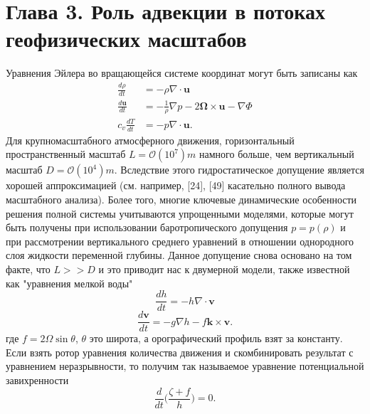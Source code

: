 \chapter*{Глава 3. Роль адвекции в потоках геофизических масштабов} \label{chapt_3}
Уравнения Эйлера во вращающейся системе координат могут быть записаны как
%
\begin{align}
\label{eq:equation3_1}
\frac{d\rho}{dt}&=-\rho\nabla\cdot\mathbf{u}\\
\label{eq:equation3_2}
\frac{d\mathbf{u}}{dt}&=-\frac{1}{\rho}\nabla p - 2 \mathbf{\Omega} \times \mathbf{u} - \nabla \Phi\\
\label{eq:equation3_3}
c_v\frac{dT}{dt}&=-p\nabla\cdot\mathbf{u}.
\end{align}
%
Для крупномасштабного атмосферного движения, горизонтальный пространственный масштаб $L=\mathcal{O}(10^7)m$ намного больше, чем вертикальный масштаб $D=\mathcal{O}(10^4)m$. Вследствие этого гидростатическое допущение является хорошей аппроксимацией (см. например, [24], [49] касательно полного вывода масштабного анализа). Более того, многие ключевые динамические особенности решения полной системы учитываются упрощенными моделями, которые могут быть получены при использовании баротропического допущения $p=p(\rho)$ и при  рассмотрении вертикального среднего уравнений в отношении однородного слоя жидкости переменной глубины. Данное допущение снова основано на том факте, что $L >> D$ и это приводит нас к двумерной модели, также известной как "уравнения мелкой воды"
%
\begin{equation}
\label{eq:equation3_4}
\frac{dh}{dt}=-h\nabla \cdot \mathbf{v}
\end{equation}
%
%
\begin{equation}
\label{eq:equation3_5}
\frac{d\mathbf{v}}{dt}=-g\nabla h - f\mathbf{k}\times \mathbf{v}.
\end{equation}
%
где $f=2\Omega\sin\theta$, $\theta$ это широта, а орографический профиль взят за константу. Если взять ротор уравнения количества движения и скомбинировать результат с уравнением неразрывности, то получим так называемое уравнение потенциальной завихренности
%
\begin{equation}
\label{eq:equation3_6}
\frac{d}{dt}\Big(\frac{\zeta + f}{h}\Big) = 0.
\end{equation}
%
